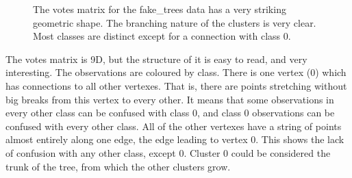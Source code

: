 \documentclass[
  letterpaper,
]{book}
\begin{document}
\begin{figure}

\begin{minipage}[t]{0.50\linewidth}

{\centering 

}

\end{minipage}%
%
\begin{minipage}[t]{0.50\linewidth}

{\centering 


}

\end{minipage}%

\caption{\label{fig-ft-votes}The votes matrix for the fake\_trees data
has a very striking geometric shape. The branching nature of the
clusters is very clear. Most classes are distinct except for a
connection with class 0.}

\end{figure}

The votes matrix is 9D, but the structure of it is easy to read, and
very interesting. The observations are coloured by class. There is one
vertex (0) which has connections to all other vertexes. That is, there
are points stretching without big breaks from this vertex to every
other. It means that some observations in every other class can be
confused with class 0, and class 0 observations can be confused with
every other class. All of the other vertexes have a string of points
almost entirely along one edge, the edge leading to vertex 0. This shows
the lack of confusion with any other class, except 0. Cluster 0 could be
considered the trunk of the tree, from which the other clusters grow.
\end{document}
